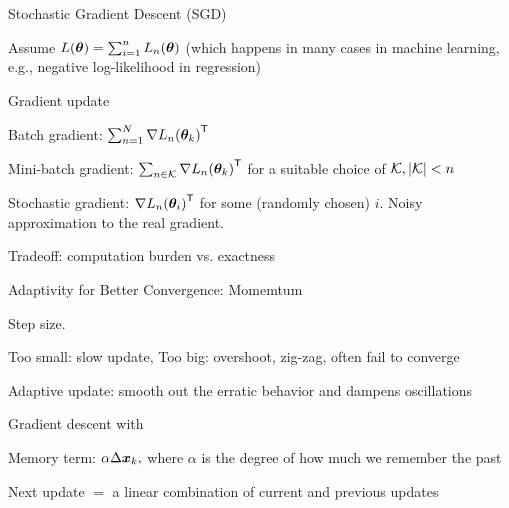 \documentclass[handout,fleqn,aspectratio=169]{beamer}
\begin{document}
\begin{frame}{Stochastic Gradient Descent (SGD)}

\plitemsep 0.1in

\bci 

\item Assume $L(\bm{\theta}) = \sum_{i=1}^n L_n(\bm{\theta})$ (which happens in many cases in machine learning, e.g., negative log-likelihood in regression)

\item Gradient update
\bci
\item Batch gradient: $\sum_{n=1}^N {\nabla L_n(\bm{\theta}_k)}^{\mathsf{T}}$
\item Mini-batch gradient: $\sum_{n \in \mathcal K} {\nabla L_n(\bm{\theta}_k)}^{\mathsf{T}}$ for a suitable choice of $\mathcal K, |\mathcal K| < n$
\item Stochastic gradient: ${\nabla L_n(\bm{\theta}_i)}^{\mathsf{T}}$ for some (randomly chosen) $i$. Noisy approximation to the real gradient. 
\eci

\item Tradeoff: computation burden vs. exactness
\eci
\end{frame}

\begin{frame}{Adaptivity for Better Convergence: Momemtum}

\plitemsep 0.1in

\bci 

\item Step size.
\bci
\item Too small: slow update, Too big: overshoot, zig-zag, often fail to converge
\eci

\item Adaptive update: smooth out the erratic behavior and dampens oscillations

\item Gradient descent with 
\vspace{-0.5cm}
\bci
\item Memory term: $\alpha \Delta \bm{x}_k,$ where $\alpha$ is the degree of how much we remember the past
\item Next update $=$ a linear combination of current and previous updates
\eci
\eci
\end{frame}
\end{document}
